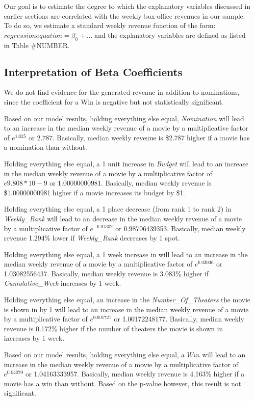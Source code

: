 \documentclass[11pt]{article} %
\begin{document}
Our goal is to estimate the degree to which the explanatory variables discussed in earlier sections are correlated with the weekly box-office revenues in our sample. To do so, we estimate a standard weekly revenue function of the form: 
$regression equation = \beta_0 + ... $
and the explanatory variables are defined as listed in Table #NUMBER. 

\subsection{Interpretation of Beta Coefficients}
We do not find evidence for the generated revenue in addition to nominations, since the coefficient for a Win is negative but not statistically significant. 

Based on our model results, holding everything else equal, \textit{Nomination} will lead to an increase in the median weekly revenue of a movie by a multiplicative factor of $e^{1.025}$ or $2.787$. Basically, median weekly revenue is \$2.787 higher if a movie has a nomination than without. 

Holding everything else equal, a 1 unit increase in \textit{Budget} will lead to an increase in the median weekly revenue of a movie by a multiplicative factor of $e9.808*10-9$ or $1.00000000981$.  Basically, median weekly revenue is \$1.00000000981 higher if a movie increases its budget by \$1.

Holding everything else equal, a 1 place decrease (from rank 1 to rank 2) in \textit{Weekly\_Rank} will lead to an decrease in the median weekly revenue of a movie by a multiplicative factor of $e^{-0.01302}$ or 0.98706439353.  Basically, median weekly revenue 1.294\% lower if  \textit{Weekly\_Rank} decreases by 1 spot.

Holding everything else equal, a 1 week increase in   will lead to an increase in the median weekly revenue of a movie by a multiplicative factor of $e^0.03036$ or 1.03082556437.  Basically, median weekly revenue is 3.083\% higher if \textit{Cumulative\_Week} increases by 1 week.

Holding everything else equal, an increase in the \textit{Number\_Of\_Theaters} the movie is shown in by 1 will lead to an increase in the median weekly revenue of a movie by a multiplicative factor of $e^{0.001721}$ or 1.00172248177.  Basically, median weekly revenue is 0.172\% higher if the number of theaters the movie is shown in  increases by 1 week.

Based on our model results, holding everything else equal, a $Win$ will lead to an increase in the median weekly revenue of a movie by a multiplicative factor of $e^{0.04079}$ or 1.04163333957. Basically, median weekly revenue is 4.163\%  higher if a movie has a win than without. Based on the p-value however, this result is not significant.
\end{document}
